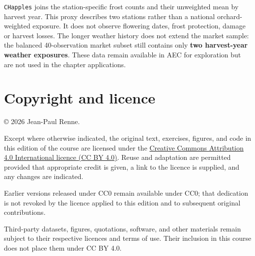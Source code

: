 \documentclass[
  11pt,
]{book}
\theoremstyle{definition}
\theoremstyle{definition}
\theoremstyle{definition}
\theoremstyle{definition}
\theoremstyle{remark}
\begin{document}
\texttt{CHapples} joins the station-specific frost counts and their unweighted mean by harvest year. This proxy describes two stations rather than a national orchard-weighted exposure. It does not observe flowering dates, frost protection, damage or harvest losses. The longer weather history does not extend the market sample: the balanced 40-observation market subset still contains only \textbf{two harvest-year weather exposures}. These data remain available in AEC for exploration but are not used in the chapter applications.

\chapter*{Copyright and licence}\label{copyright-and-licence}

© 2026 Jean-Paul Renne.

Except where otherwise indicated, the original text, exercises, figures, and code in this edition of the course are licensed under the \href{https://creativecommons.org/licenses/by/4.0/}{Creative Commons Attribution 4.0 International licence (CC BY 4.0)}. Reuse and adaptation are permitted provided that appropriate credit is given, a link to the licence is supplied, and any changes are indicated.

Earlier versions released under CC0 remain available under CC0; that dedication is not revoked by the licence applied to this edition and to subsequent original contributions.

Third-party datasets, figures, quotations, software, and other materials remain subject to their respective licences and terms of use. Their inclusion in this course does not place them under CC BY 4.0.

  
\end{document}
